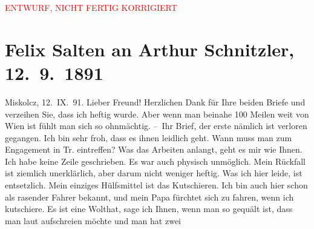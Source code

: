 
\begin{center}
            \textcolor{red}{ENTWURF, NICHT FERTIG KORRIGIERT}
                      \end{center}
            
         
         \renewcommand{\erwaehntePersonen}{Personen: Philipp Salzmann, Michael Emil Salzmann}
         \renewcommand{\erwaehnteOrte}{Orte: Café Kremser, Italien, Miskolc, Opava, Uppony, Upponyi-szoros, Wien}
         \renewcommand{\erwaehnteWerke}{}
               \section[Felix Salten an Arthur Schnitzler, 12. 9. 1891]{ Felix Salten an Arthur Schnitzler, 12. 9. 1891}\nopagebreak{}\rehead{ }\begin{ledgroupsized}[t]{13cm}\normalsize\beginnumbering \toendnotes[C]{\smallbreak\pagebreak[2]} 
\toendnotes[C]{\smallbreak}\pstart
           {\pb}Miskolcz, 12. IX. 91.
               \pend
           \pstart
           Lieber Freund! Herzlichen Dank für Ihre beiden Briefe und verzeihen
               Sie, dass ich heftig wurde. Aber wenn man beinahe 100 Meilen weit von Wien ist fühlt man sich so ohnmächtig. \pend
           \pstart
           – Ihr Brief, der erste nämlich ist verloren gegangen. Ich bin sehr froh, dass es
               ihnen leidlich geht. Wann muss man zum Engagement in Tr. eintreffen? Was das Arbeiten anlangt, geht es mir wie Ihnen. Ich habe
               keine Zeile geschrieben. Es war auch physisch unmöglich. Mein Rückfall ist ziemlich
               unerklärlich, aber darum nicht weniger heftig. Was ich hier leide, ist entsetzlich.
               Mein einziges Hülfsmittel ist das Kutschieren. Ich bin auch hier schon als rasender
               Fahrer bekannt, und mein Papa fürchtet sich zu fahren, wenn ich kutschiere. Es ist eine Wolthat, sage
               ich Ihnen, wenn man so gequält ist, dass man laut aufschreien möchte und man hat zwei

\end{ledgroupsized}
